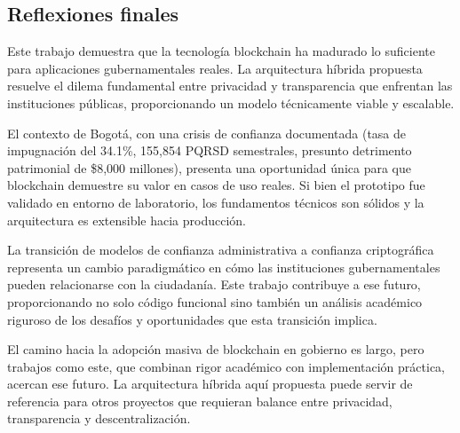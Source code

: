 \subsection{Reflexiones finales}

Este trabajo demuestra que la tecnología blockchain ha madurado lo suficiente para aplicaciones gubernamentales reales. La arquitectura híbrida propuesta resuelve el dilema fundamental entre privacidad y transparencia que enfrentan las instituciones públicas, proporcionando un modelo técnicamente viable y escalable.

El contexto de Bogotá, con una crisis de confianza documentada (tasa de impugnación del 34.1\%, 155,854 PQRSD semestrales, presunto detrimento patrimonial de \$8,000 millones), presenta una oportunidad única para que blockchain demuestre su valor en casos de uso reales. Si bien el prototipo fue validado en entorno de laboratorio, los fundamentos técnicos son sólidos y la arquitectura es extensible hacia producción.

La transición de modelos de confianza administrativa a confianza criptográfica representa un cambio paradigmático en cómo las instituciones gubernamentales pueden relacionarse con la ciudadanía. Este trabajo contribuye a ese futuro, proporcionando no solo código funcional sino también un análisis académico riguroso de los desafíos y oportunidades que esta transición implica.

El camino hacia la adopción masiva de blockchain en gobierno es largo, pero trabajos como este, que combinan rigor académico con implementación práctica, acercan ese futuro. La arquitectura híbrida aquí propuesta puede servir de referencia para otros proyectos que requieran balance entre privacidad, transparencia y descentralización.